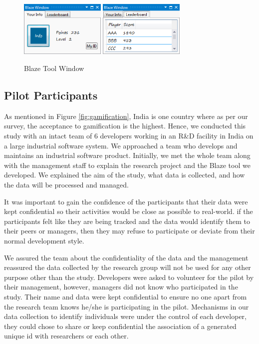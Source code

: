 \documentclass{sig-alternate}
\begin{document}
\begin{figure}
	\centering
	\includegraphics[width=1.6in]{blazeWindow.png}
\includegraphics[width=1.6in]{blazeLeaderboard.png}
	\caption{Blaze Tool Window}
	\label{fig:blazeWindow}
\end{figure}


\subsection{Pilot Participants}

As mentioned in Figure \ref{fig:gamification}, India is one country where as per our survey, the acceptance to gamification is the highest. Hence, we conducted this study with an intact team of 6 developers working in an R\&D facility in India on a large industrial software system. We approached a team who develops and maintains an industrial software product. Initially, we met the whole team along with the management staff to explain the research project and the Blaze tool we developed. We  explained the aim of the study, what data is collected, and how the data will be processed and managed. 

It was important to gain the confidence of the participants that their data were kept confidential so their activities would be close as possible to real-world. if the participants felt like they are being tracked and the data would identify them to their peers or managers, then they may refuse to participate or deviate from their normal development style.

We  assured the team about the confidentiality of the data and the management reassured the data collected by the research group will not be used for any other purpose other than the study.  Developers were asked to volunteer for the pilot by their management, however, managers did not know who participated in the study. Their name and data were kept confidential to ensure no one apart from the research team knows he/she is participating in the pilot. Mechanisms in our data collection to identify individuals were under the control of each developer, they could chose to share or keep confidential the association of a generated unique id with researchers or each other.   
\end{document}
